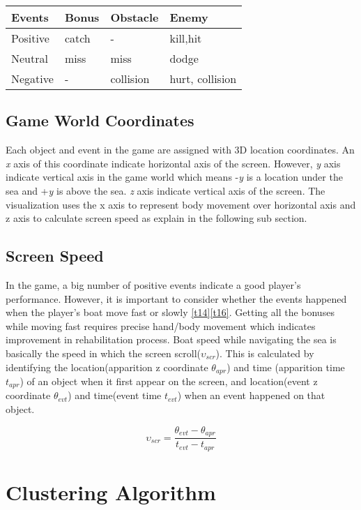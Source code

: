 \begin{center}
    \begin{tabular}{| l | l | l | l |}
    \hline
    Events & Bonus & Obstacle & Enemy \\ \hline
    Positive & catch & - & kill,hit\\ \hline
    Neutral & miss & miss & dodge\\ \hline
    Negative & - & collision & hurt, collision\\
    \hline
    \end{tabular}
\end{center}

\subsection{Game World Coordinates}
Each object and event in the game are assigned with 3D location coordinates. An \textit{x} axis of this coordinate indicate horizontal axis of the screen. However, \textit{y} axis indicate vertical axis in the game world which means -\textit{y} is a location under the sea and +\textit{y} is above the sea. \textit{z} axis indicate vertical axis of the screen. The visualization uses the x axis to represent body movement over horizontal axis and z axis to calculate screen speed as explain in the following sub section.

\subsection{Screen Speed}
In the game, a big number of positive events indicate a good player's performance. However, it is important to consider whether the events happened when the player's boat move fast or slowly \ref{t14}\ref{t16}. Getting all the bonuses while moving fast requires precise hand/body movement which indicates improvement in rehabilitation process. Boat speed while navigating the sea is basically the speed in which the screen scroll($\upsilon_{scr}$). This is calculated by identifying the location(apparition z coordinate $\theta_{apr}$) and time (apparition time $\textit{t}_{apr}$) of an object when it first appear on the screen, and location(event z coordinate $\theta_{evt}$) and time(event time $\textit{t}_{evt}$) when an event happened on that object.

$$ \upsilon_{scr} = \frac{\theta_{evt}-\theta_{apr}}{\textit{t}_{evt}-\textit{t}_{apr}} $$

\section{Clustering Algorithm}

